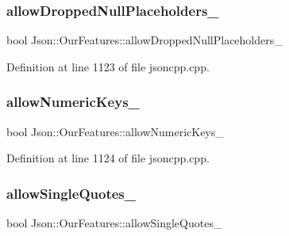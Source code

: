 \hypertarget{class_json_1_1_our_features_a13963bc44bf948eec1968f7ff8e8f5f1}{}\label{class_json_1_1_our_features_a13963bc44bf948eec1968f7ff8e8f5f1} 
\subsubsection{\texorpdfstring{allow\+Dropped\+Null\+Placeholders\+\_\+}{allowDroppedNullPlaceholders\_}}
{\footnotesize\ttfamily bool Json\+::\+Our\+Features\+::allow\+Dropped\+Null\+Placeholders\+\_\+}



Definition at line 1123 of file jsoncpp.\+cpp.

\hypertarget{class_json_1_1_our_features_af6973fc7e774ce2d634ba99442aeb91a}{}\label{class_json_1_1_our_features_af6973fc7e774ce2d634ba99442aeb91a} 
\subsubsection{\texorpdfstring{allow\+Numeric\+Keys\+\_\+}{allowNumericKeys\_}}
{\footnotesize\ttfamily bool Json\+::\+Our\+Features\+::allow\+Numeric\+Keys\+\_\+}



Definition at line 1124 of file jsoncpp.\+cpp.

\hypertarget{class_json_1_1_our_features_abbd6c196d7a22e2a360a59887eda4610}{}\label{class_json_1_1_our_features_abbd6c196d7a22e2a360a59887eda4610} 
\subsubsection{\texorpdfstring{allow\+Single\+Quotes\+\_\+}{allowSingleQuotes\_}}
{\footnotesize\ttfamily bool Json\+::\+Our\+Features\+::allow\+Single\+Quotes\+\_\+}



